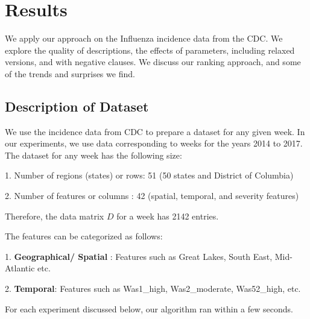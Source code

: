 \section*{Results}
\label{results}
We apply our \minapproxdesc{} approach on the Influenza incidence data from the CDC.
We explore the quality of descriptions, the effects of parameters, including 
relaxed versions, and with negative clauses. We discuss our ranking approach,
and some of the trends and surprises we find. 

\subsection*{ Description of Dataset}
We use the incidence data from CDC to prepare a dataset for any given week.  In our experiments, we use data corresponding to weeks for the years 2014 to 2017. The dataset for any week has the following size:

1. Number of regions (states) or rows: 51 (50 states and District of Columbia) 

2. Number of features or columns :  42 (spatial, temporal, and severity features)

Therefore, the data matrix $D$ for a week has 2142 entries. 

The features can be categorized as follows:

1. \textbf{Geographical/ Spatial} :  Features such as Great Lakes, South East, Mid-Atlantic etc. %

2. \textbf{Temporal}: Features such as Was1_high, Was2_moderate, Was52_high, etc. %


For each experiment discussed below, our algorithm ran within a few seconds.

